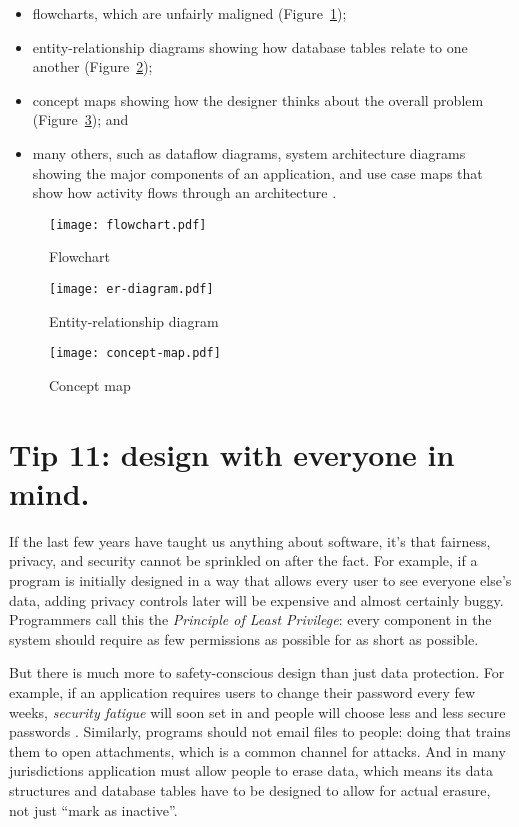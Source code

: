 \documentclass[10pt,letterpaper]{article}
\begin{document}
\begin{itemize}
\item
  flowcharts, which are unfairly maligned \cite{Scanlan1989}
  (Figure~\ref{flowchart});
\item
  entity-relationship diagrams showing how database tables relate to one another
  (Figure~\ref{er-diagram});
\item
  concept maps showing how the designer thinks about the overall problem
  (Figure~\ref{concept-map}); and
\item
  many others,
  such as dataflow diagrams,
  system architecture diagrams showing the major components of an application,
  and use case maps that show how activity flows through an architecture \cite{Reekie2006}.
\end{itemize}

\begin{figure}
  \centering
  \texttt{[image: flowchart.pdf]}
  \caption{Flowchart}
  \label{flowchart}
\end{figure}

\begin{figure}
  \centering
  \texttt{[image: er-diagram.pdf]}
  \caption{Entity-relationship diagram}
  \label{er-diagram}
\end{figure}

\begin{figure}
  \centering
  \texttt{[image: concept-map.pdf]}
  \caption{Concept map}
  \label{concept-map}
\end{figure}

\section*{Tip 11: design with everyone in mind.}

If the last few years have taught us anything about software,
it's that fairness, privacy, and security cannot be sprinkled on after the fact.
For example,
if a program is initially designed in a way that allows every user to see everyone else's data,
adding privacy controls later will be expensive and almost certainly buggy.
Programmers call this the \emph{Principle of Least Privilege}:
every component in the system should require as few permissions as possible
for as short as possible.

But there is much more to safety-conscious design than just data protection.
For example,
if an application requires users to change their password every few weeks,
\emph{security fatigue} will soon set in
and people will choose less and less secure passwords \cite{Smalls2021}.
Similarly,
programs should not email files to people:
doing that trains them to open attachments,
which is a common channel for attacks.
And in many jurisdictions application must allow people to erase data,
which means its data structures and database tables have to be designed to allow for actual erasure,
not just ``mark as inactive''.
\end{document}
